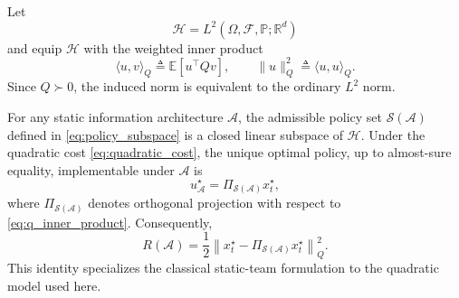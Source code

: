Let
\begin{equation}
    \mathcal{H}
    =
    L^2(
        \Omega,\mathcal{F},\mathbb{P};
        \mathbb{R}^{d}
    )
    \label{eq:hilbert_space}
\end{equation}
and equip $\mathcal{H}$ with the weighted inner product
\begin{equation}
    \langle u,v\rangle_Q
    \triangleq
    \mathbb{E}
    \left[
        u^\top Qv
    \right],
    \qquad
    \|u\|_Q^2
    \triangleq
    \langle u,u\rangle_Q.
    \label{eq:q_inner_product}
\end{equation}
Since $Q\succ0$, the induced norm is equivalent to the ordinary $L^2$ norm.

\begin{lemma}
\label{lem:radner_projection}
For any static information architecture $\mathcal{A}$, the admissible policy set
$\mathcal{S}(\mathcal{A})$ defined in \eqref{eq:policy_subspace} is a closed
linear subspace of $\mathcal{H}$. Under the quadratic cost
\eqref{eq:quadratic_cost}, the unique optimal policy, up to almost-sure equality, implementable under
$\mathcal{A}$ is
\begin{equation}
    u_{\mathcal{A}}^\star
    =
    \Pi_{\mathcal{S}(\mathcal{A})}
    x_t^\star,
    \label{eq:optimal_projection}
\end{equation}
where $\Pi_{\mathcal{S}(\mathcal{A})}$ denotes orthogonal projection with
respect to \eqref{eq:q_inner_product}. Consequently,
\begin{equation}
    \boxed{
    R(\mathcal{A})
    =
    \frac{1}{2}
    \left\|
        x_t^\star
        -
        \Pi_{\mathcal{S}(\mathcal{A})}
        x_t^\star
    \right\|_Q^2 .
    }
    \label{eq:projection_regret}
\end{equation}
This identity specializes the classical static-team formulation
\cite{radner1962team} to the quadratic model used here.
\end{lemma}


